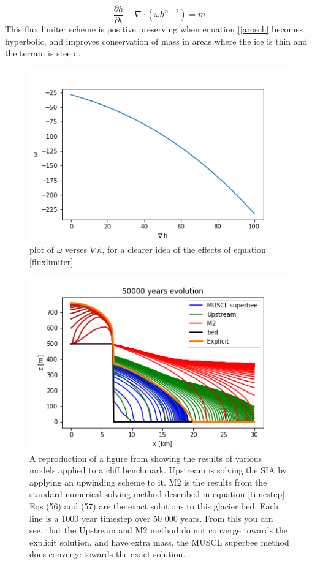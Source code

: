 \documentclass{article}
\begin{document}
\begin{equation}\label{jarosch}
\frac{\partial h}{\partial t} + \nabla \cdot (\omega h^{n+2}) = m 
\end{equation}
This flux limiter scheme is positive preserving when equation \ref{jarosch} becomes hyperbolic, and improves conservation of mass in areas where the ice is thin and the terrain is steep \citep{Jarosch2013}. 
\begin{figure}[H]
    \centering
    \includegraphics[width=13cm]{Iceflux.png}
    \caption{plot of $\omega$ verses $\nabla h$, for a clearer idea of the effects of equation \ref{fluxlimiter}
}
    \label{fig:Iceflux}
\end{figure}
\begin{figure}[H]
    \centering
    \includegraphics[width=13cm]{JaroschPaperFigure3.png}
    \caption{A reproduction of a figure from \citet{Jarosch2013} showing the results of various models applied to a cliff benchmark. Upstream is solving the SIA by applying an upwinding scheme to it. M2 is the results from the standard numerical solving method described in equation \ref{timestep}. Eqs (56) and (57) are the exact solutions to this glacier bed. Each line is a 1000 year timestep over 50 000 years. From this you can see, that the Upstream and M2 method do not converge towards the explicit solution, and have extra mass, the MUSCL superbee method does converge towards the exact solution.
}
    \label{fig:JaroschPaper}
\end{figure}
\end{document}
